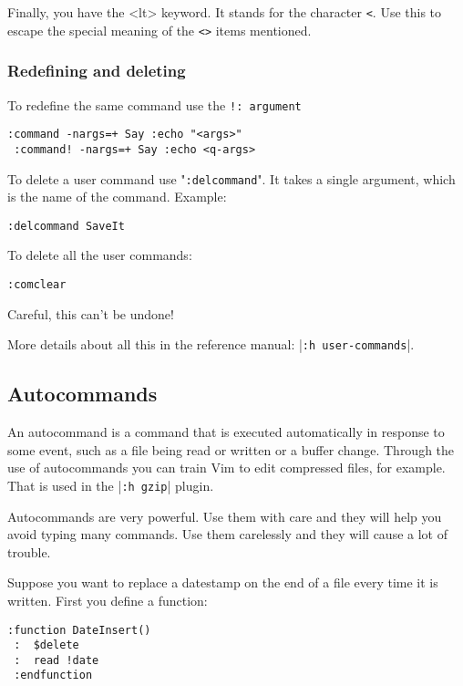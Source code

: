 Finally, you have the <lt> keyword.
It stands for the character \texttt{<}.
Use this to escape the special meaning of the \texttt{<>} items mentioned.

\subsubsection{Redefining and deleting}
To redefine the same command use the \texttt{!: argument}

\begin{Verbatim}[samepage=true]
 :command -nargs=+ Say :echo "<args>"
 :command! -nargs=+ Say :echo <q-args>
\end{Verbatim}

To delete a user command use "\texttt{:delcommand}".
It takes a single argument, which is the name of the command.
Example:

\begin{Verbatim}[samepage=true]
 :delcommand SaveIt
\end{Verbatim}

To delete all the user commands:

\begin{Verbatim}[samepage=true]
 :comclear
\end{Verbatim}

Careful, this can't be undone!

More details about all this in the reference manual: |\texttt{:h user-commands}|.
\subsection{Autocommands}
\label{Autocommands}
An autocommand is a command that is executed automatically in response to some event, such as a file being read or written or a buffer change.
Through the use of autocommands you can train Vim to edit compressed files, for example.
That is used in the |\texttt{:h gzip}| plugin.

Autocommands are very powerful.
Use them with care and they will help you avoid typing many commands.
Use them carelessly and they will cause a lot of trouble.

Suppose you want to replace a datestamp on the end of a file every time it is written.
First you define a function:

\begin{Verbatim}[samepage=true]
 :function DateInsert()
 :  $delete
 :  read !date
 :endfunction
\end{Verbatim}


